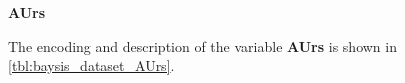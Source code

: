 \Large
\centerline{\textbf{AUrs}}
\normalsize
The encoding and description of the variable \textbf{AUrs} is shown in \autoref{tbl:baysis_dataset_AUrs}.

